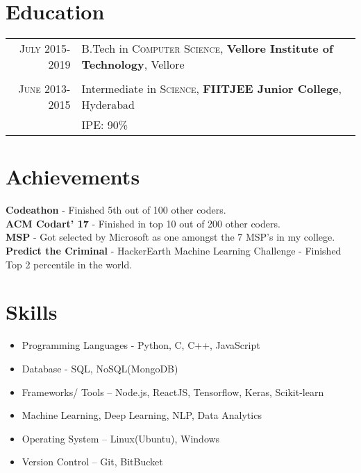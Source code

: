\documentclass[a4paper,10pt]{article}
\begin{document}
\section{Education}
\begin{tabular}{rl}	
\textsc{July} 2015-2019 & B.Tech in \textsc{Computer Science}, \textbf{Vellore Institute of Technology}, Vellore\\ \\
\textsc{June} 2013-2015 & Intermediate in \textsc{Science}, \normalsize\textbf{FIITJEE Junior College}, Hyderabad\\
&\normalsize \textsc{IPE}: 90\% \\
\end{tabular}

\section{Achievements}
\begin{flushleft}
\textbf{Codeathon} -  Finished 5th out of 100 other coders. \\
\textbf{ACM Codart' 17} - Finished in top 10 out of 200 other coders. \\
\textbf{MSP} - Got selected by Microsoft as one amongst the 7 MSP's in my college. \\
\textbf{Predict the Criminal} - HackerEarth Machine Learning Challenge - Finished Top 2 percentile in the world. \\
\end{flushleft}

\section{Skills}
\begin{multicols}{2}
\begin{itemize}
    \item Programming Languages - Python, C, C++, JavaScript
    \item Database - SQL, NoSQL(MongoDB)
    \item Frameworks/ Tools – Node.js, ReactJS, Tensorflow, Keras, Scikit-learn
    \item Machine Learning, Deep Learning, NLP, Data Analytics
    \item Operating System – Linux(Ubuntu), Windows
    \item Version Control – Git, BitBucket
\end{itemize}
\end{multicols}
\end{document}
